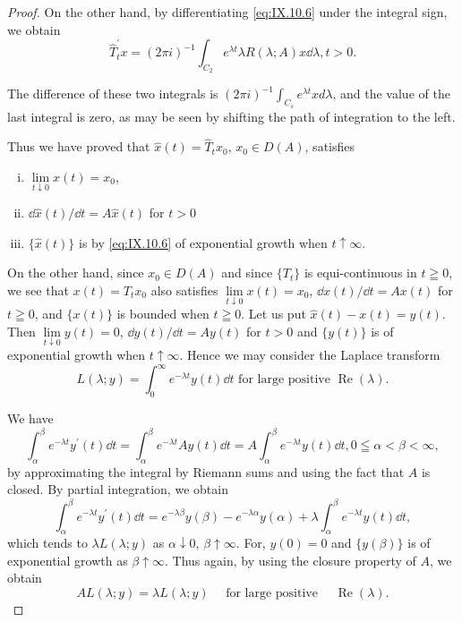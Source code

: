\begin{proof}
On the other hand, by differentiating \eqref{eq:IX.10.6} under the integral sign, we obtain 
\begin{equation}\label{eq:IX.10.7}
\hat {T} _{t} ^{\prime} x = (2 \pi i) ^{-1} \int_ {C _{2}} e ^{\lambda t} \lambda R (\lambda ; A) x \dd \lambda , t > 0.
\end{equation}

The difference of these two integrals is $(2\pi i)^{-1}\int_{C_{s}}e^{\lambda t}xd\lambda$, and the value of the last integral is zero, as may be seen by shifting the path of integration to the left. 

Thus we have proved that $\hat{x}(t) = \hat{T}_t x_0$, $x_0 \in D(A)$, satisfies \begin{enumerate}[i)]
\item $\lim\limits_{t \downarrow 0} \hat{x}(t) = x_0$,
\item $\dd\hat{x}(t)/\dd t = A\hat{x}(t)$ for $t > 0$
\item $\{\hat{x}(t)\}$ is by \eqref{eq:IX.10.6} of exponential growth when $t \uparrow \infty$.
\end{enumerate}
 On the other hand, since $x_0 \in D(A)$ and since $\{T_t\}$ is equi-continuous in $t \geqq 0$, we see that $x(t) = T_t x_0$ also satisfies $\lim\limits_{t \downarrow 0} x(t) = x_0$, $\dd x(t)/\dd t = Ax(t)$ for $t \geqq 0$, and $\{x(t)\}$ is bounded when $t \geqq 0$. Let us put $\hat{x}(t) - x(t) = y(t)$. Then $\lim\limits_{t \downarrow 0} y(t) = 0$, $\dd y(t)/\dd t = Ay(t)$ for $t > 0$ and $\{y(t)\}$ is of exponential growth when $t \uparrow \infty$. Hence we may consider the Laplace transform 
\[
L (\lambda ; y) = \int_{0} ^{\infty} e ^{- \lambda t} y (t) \dd t \text{ for large positive } \operatorname{Re} (\lambda).
\]

We have 
\[
\int_{\alpha} ^{\beta} e ^{- \lambda t} y ^{\prime} (t) \dd t = \int_{\alpha} ^{\beta} e ^{- \lambda t} A y (t) \dd t = A \int_{\alpha} ^{\beta} e ^{- \lambda t} y (t) \dd t, 0 \leqq \alpha < \beta < \infty ,
\]
by approximating the integral by Riemann sums and using the fact that $A$ is closed. By partial integration, we obtain 
\[
\int_{\alpha} ^{\beta} e ^{- \lambda t} y ^{\prime} (t) \dd t = e ^{- \lambda \beta} y (\beta) - e ^{- \lambda \alpha} y (\alpha) + \lambda \int_{\alpha} ^{\beta} e ^{- \lambda t} y (t) \dd t,
\]
which tends to $\lambda L(\lambda; y)$ as $\alpha \downarrow 0$, $\beta \uparrow \infty$. For, $y(0) = 0$ and $\{y(\beta)\}$ is of exponential growth as $\beta \uparrow \infty$. Thus again, by using the closure property of $A$, we obtain 
\[
A L (\lambda ; y) = \lambda L (\lambda ; y) \quad \text{ for large positive } \quad \operatorname{Re} (\lambda).
\]


\end{proof}
